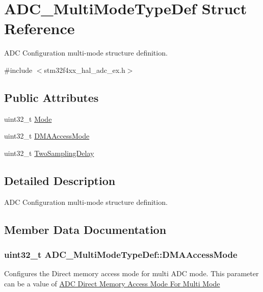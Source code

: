 \hypertarget{struct_a_d_c___multi_mode_type_def}{}\section{A\+D\+C\+\_\+\+Multi\+Mode\+Type\+Def Struct Reference}
\label{struct_a_d_c___multi_mode_type_def}


A\+DC Configuration multi-\/mode structure definition.  




{\ttfamily \#include $<$stm32f4xx\+\_\+hal\+\_\+adc\+\_\+ex.\+h$>$}

\subsection*{Public Attributes}
\begin{DoxyCompactItemize}
\item 
uint32\+\_\+t \hyperlink{struct_a_d_c___multi_mode_type_def_a424b5606c9d5dfbfdc850080d34552ff}{Mode}
\item 
uint32\+\_\+t \hyperlink{struct_a_d_c___multi_mode_type_def_a7b7dd802999d735f7179574946acb57d}{D\+M\+A\+Access\+Mode}
\item 
uint32\+\_\+t \hyperlink{struct_a_d_c___multi_mode_type_def_a5590cc138c49a97c6433caa29592cd1b}{Two\+Sampling\+Delay}
\end{DoxyCompactItemize}


\subsection{Detailed Description}
A\+DC Configuration multi-\/mode structure definition. 

\subsection{Member Data Documentation}
\subsubsection[{\texorpdfstring{D\+M\+A\+Access\+Mode}{DMAAccessMode}}]{\setlength{\rightskip}{0pt plus 5cm}uint32\+\_\+t A\+D\+C\+\_\+\+Multi\+Mode\+Type\+Def\+::\+D\+M\+A\+Access\+Mode}\hypertarget{struct_a_d_c___multi_mode_type_def_a7b7dd802999d735f7179574946acb57d}{}\label{struct_a_d_c___multi_mode_type_def_a7b7dd802999d735f7179574946acb57d}
Configures the Direct memory access mode for multi A\+DC mode. This parameter can be a value of \hyperlink{group___a_d_c_ex___direct__memory__access__mode__for__multi__mode}{A\+DC Direct Memory Access Mode For Multi Mode} 
